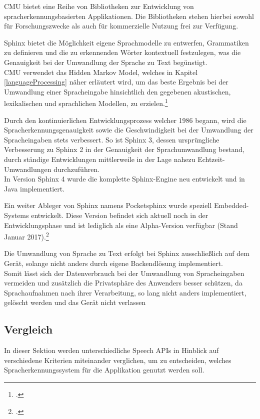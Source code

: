 \ac{CMU} bietet eine Reihe von Bibliotheken zur Entwicklung von spracherkennungsbasierten Applikationen. Die Bibliotheken stehen hierbei sowohl für Forschungszwecke als auch für kommerzielle Nutzung frei zur Verfügung.

Sphinx bietet die Möglichkeit eigene Sprachmodelle zu entwerfen, Grammatiken zu definieren und die zu erkennenden Wörter kontextuell festzulegen, was die Genauigkeit bei der Umwandlung der Sprache zu Text begünstigt.\\
\ac{CMU} verwendet das Hidden Markov Model, welches in Kapitel \ref{languageProcessing} näher erläutert wird, um das beste Ergebnis bei der Umwandlung einer Spracheingabe hinsichtlich den gegebenen akustischen, lexikalischen und sprachlichen Modellen, zu erzielen.\footcite[vgl.:][]{CMUSphinx}

Durch den kontinuierlichen Entwicklungsprozess welcher 1986 begann, wird die Spracherkennungsgenauigkeit sowie die Geschwindigkeit bei der Umwandlung der Spracheingaben stets verbessert. So ist Sphinx 3, dessen ursprüngliche Verbesserung zu Sphinx 2 in der Genauigkeit der Sprachumwandlung bestand, durch ständige Entwicklungen mittlerweile in der Lage nahezu Echtzeit-Umwandlungen durchzuführen.\\
In Version Sphinx 4 wurde die komplette Sphinx-Engine neu entwickelt und in Java implementiert.

Ein weiter Ableger von Sphinx namens Pocketsphinx wurde speziell Embedded-Systems entwickelt. Diese Version befindet sich aktuell noch in der Entwicklungsphase und ist lediglich als eine Alpha-Version verfügbar (Stand Januar 2017).\footcite[vgl.:][]{wikiCMUSphinx}

Die Umwandlung von Sprache zu Text erfolgt bei Sphinx ausschließlich auf dem Gerät, solange nicht anders durch eigene Backendlösung implementiert.\\
Somit lässt sich der Datenverbrauch bei der Umwandlung von Spracheingaben vermeiden und zusätzlich die Privatsphäre des Anwenders besser schützen, da Sprachaufnahmen nach ihrer Verarbeitung, so lang nicht anders implementiert, gelöscht werden und das Gerät nicht verlassen

\subsection{Vergleich}

In dieser Sektion werden unterschiedliche Speech \ac{API}s in Hinblick auf verschiedene Kriterien miteinander verglichen, um zu entscheiden, welches Spracherkennungssystem für die Applikation genutzt werden soll.

